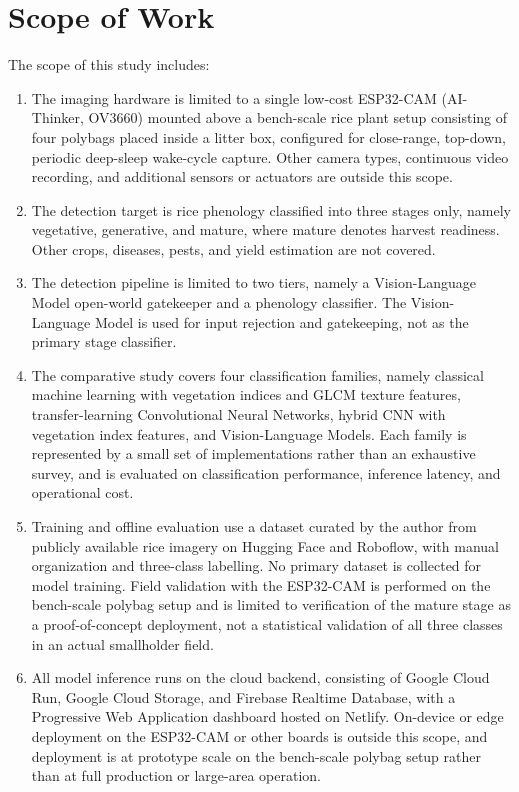 \section{Scope of Work}
The scope of this study includes:
\begin{enumerate}
    \item The imaging hardware is limited to a single low-cost ESP32-CAM (AI-Thinker, OV3660) mounted above a bench-scale rice plant setup consisting of four polybags placed inside a litter box, configured for close-range, top-down, periodic deep-sleep wake-cycle capture. Other camera types, continuous video recording, and additional sensors or actuators are outside this scope.

    \item The detection target is rice phenology classified into three stages only, namely vegetative, generative, and mature, where mature denotes harvest readiness. Other crops, diseases, pests, and yield estimation are not covered.

    \item The detection pipeline is limited to two tiers, namely a Vision-Language Model open-world gatekeeper and a phenology classifier. The Vision-Language Model is used for input rejection and gatekeeping, not as the primary stage classifier.

    \item The comparative study covers four classification families, namely classical machine learning with vegetation indices and GLCM texture features, transfer-learning Convolutional Neural Networks, hybrid CNN with vegetation index features, and Vision-Language Models. Each family is represented by a small set of implementations rather than an exhaustive survey, and is evaluated on classification performance, inference latency, and operational cost.

    \item Training and offline evaluation use a dataset curated by the author from publicly available rice imagery on Hugging Face and Roboflow, with manual organization and three-class labelling. No primary dataset is collected for model training. Field validation with the ESP32-CAM is performed on the bench-scale polybag setup and is limited to verification of the mature stage as a proof-of-concept deployment, not a statistical validation of all three classes in an actual smallholder field.

    \item All model inference runs on the cloud backend, consisting of Google Cloud Run, Google Cloud Storage, and Firebase Realtime Database, with a Progressive Web Application dashboard hosted on Netlify. On-device or edge deployment on the ESP32-CAM or other boards is outside this scope, and deployment is at prototype scale on the bench-scale polybag setup rather than at full production or large-area operation.


\end{enumerate}
